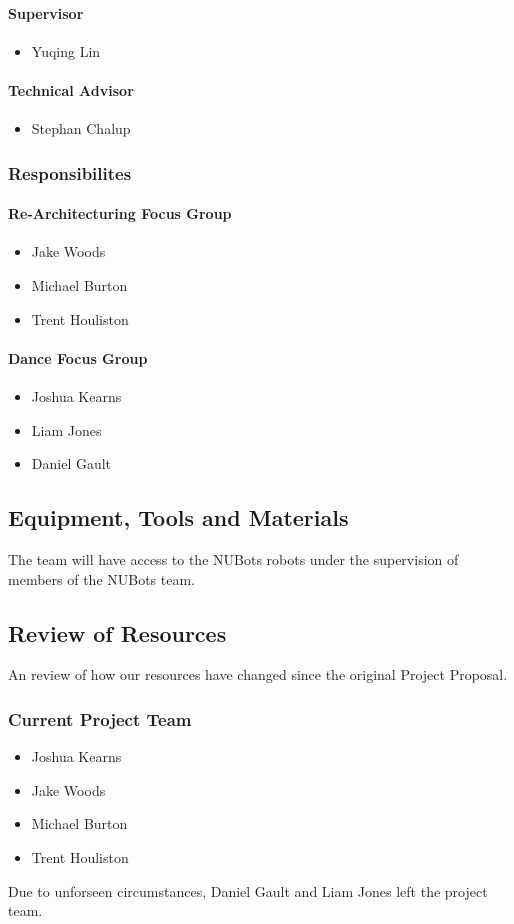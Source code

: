\documentclass[a4paper]{article}
\begin{document}
				\paragraph{Supervisor}
					\begin{itemize}
						\item Yuqing Lin
					\end{itemize}
				\paragraph{Technical Advisor}
					\begin{itemize}
						\item Stephan Chalup
					\end{itemize}
			\subsubsection{Responsibilites}
				\paragraph{Re-Architecturing Focus Group}
					\begin{itemize}
						\item Jake Woods
						\item Michael Burton
						\item Trent Houliston
					\end{itemize}
				\paragraph{Dance Focus Group}
					\begin{itemize}
						\item Joshua Kearns
						\item Liam Jones
						\item Daniel Gault
					\end{itemize}
		\subsection{Equipment, Tools and Materials}
			The team will have access to the NUBots robots under the supervision of members of the NUBots team.
		\subsection {Review of Resources}
			An review of how our resources have changed since the original Project Proposal.
			\subsubsection{Current Project Team}
				\begin{itemize}
					\item Joshua Kearns
					\item Jake Woods
					\item Michael Burton
					\item Trent Houliston
				\end{itemize}
				Due to unforseen circumstances, Daniel Gault and Liam Jones left the project team.
\end{document}
